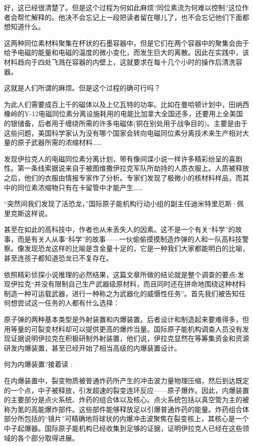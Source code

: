 好，这已经很清楚了。但是这个过程为何如此麻烦?同位素流为何难以控制?这位作者会帮忙解释的。他决不会忘记上一段把读者留在哪儿了，也不会忘记他们下面都想知道什么。

这两种同位素材料聚集在杯状的石墨容器中，但是它们在两个容器中的聚集会由于给予电磁的能量和电磁的温度的微小变化，而发生巨大的离散。因此在实践中，该材料趋向于四处飞溅在容器的内壁上，这就要求在每十几个小时的操作后清洗容器。

这就是人们所谓的麻烦。但是这个过程的确可行吗？

为此人们需要成百上千的磁体以及上亿瓦特的功率。比如在曼哈顿计划中，田纳西橡岭的Y-12电磁同位素分离设施耗用的电能比加拿大全国还多，还要用上全美国的银储备，后者用于缠绕所需的许多电磁体(铜在别处用于战争目的)。主要是由于这些问题，美国科学家认为没有哪个国家会转向电磁同位素分离技术来生产相对大量的原子武器所需的浓缩材料……

发现伊拉克人的电磁同位素分离计划，带有像间谍小说一样许多精彩纷呈的喜剧性。第一条线索据说来自于被图维撒伊拉克军队所劫持的人质衣服上。人质被释放之后，他们的衣服由情报专家作了分析。专家们发现了极微小的核材料样品，而其中的同位素浓缩物只有在卡留管中才能产生……

“突然间我们发现了活恐龙，”国际原子能机构行动小组的副主任迪米特里厄斯·佩里克斯这样说。

甚至在如此的高科技中，作者也从未丢失人的因素。这不是一个有关“科学”的故事，而是有关人从事“科学”的故事——一伙偷偷摸摸制造炸弹的人和一队高科技警察。像发现恐龙这样的比喻是含金量十足的，它是一种我们大家都能明白的比喻，甚至连孩子都知道恐龙已不复存在。

依照精彩侦探小说推理的必然结果，这篇文章所做的结论就是整个调查的要点:发现伊拉克“并没有限制自己生产武器级原材料，而且同时还在拼命地围绕这种材料制造一种可运载武器，进行一种称之为武器化的威慑性任务”。首先我们被告知任何想尝试这一任务的人都有什么选择：

原子弹的两种基本类型是外射装置和内爆装置。后者设计和制造起来要难得多，但用等量的可裂变材料却可以提供更高的爆炸当量。国际原子能机构调查人员没有发现证据说明伊拉克在积极研制外射装置，他们说，伊拉克显然在等筹集资金和资源研发内爆装置，甚至已经开始了相当高级的内爆装置设计。

何为内爆装置?接着读 :

在内爆装置中，裂变物质被普通炸药所产生的冲击波力量物理压缩，然后到达既定的一个点，中子被释放，引发超速的裂变连环反应——原子爆炸。因此，内爆装置的主要部分是点火系统、炸药的组合体以及核心。点火系统包括以真空管为主的被称为氪的高能爆炸部件。这些部件能够释放足以引爆普通炸药的能量。炸药组合体部分所包括的“镜片”可精确地将球状的内爆冲击波聚焦在裂变核上，其核心是一个中子起爆器。国际原子能机构已经收集到足够的证据，证明伊拉克人已经在这些领域的各个部分取得进展。

